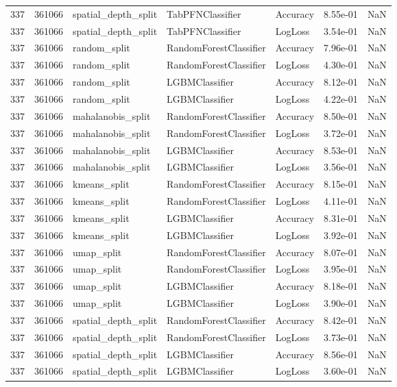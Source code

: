 \begin{tabular}{rrlllrr}
337 & 361066 & spatial\_depth\_split & TabPFNClassifier & Accuracy & 8.55e-01 & NaN \\
337 & 361066 & spatial\_depth\_split & TabPFNClassifier & LogLoss & 3.54e-01 & NaN \\
337 & 361066 & random\_split & RandomForestClassifier & Accuracy & 7.96e-01 & NaN \\
337 & 361066 & random\_split & RandomForestClassifier & LogLoss & 4.30e-01 & NaN \\
337 & 361066 & random\_split & LGBMClassifier & Accuracy & 8.12e-01 & NaN \\
337 & 361066 & random\_split & LGBMClassifier & LogLoss & 4.22e-01 & NaN \\
337 & 361066 & mahalanobis\_split & RandomForestClassifier & Accuracy & 8.50e-01 & NaN \\
337 & 361066 & mahalanobis\_split & RandomForestClassifier & LogLoss & 3.72e-01 & NaN \\
337 & 361066 & mahalanobis\_split & LGBMClassifier & Accuracy & 8.53e-01 & NaN \\
337 & 361066 & mahalanobis\_split & LGBMClassifier & LogLoss & 3.56e-01 & NaN \\
337 & 361066 & kmeans\_split & RandomForestClassifier & Accuracy & 8.15e-01 & NaN \\
337 & 361066 & kmeans\_split & RandomForestClassifier & LogLoss & 4.11e-01 & NaN \\
337 & 361066 & kmeans\_split & LGBMClassifier & Accuracy & 8.31e-01 & NaN \\
337 & 361066 & kmeans\_split & LGBMClassifier & LogLoss & 3.92e-01 & NaN \\
337 & 361066 & umap\_split & RandomForestClassifier & Accuracy & 8.07e-01 & NaN \\
337 & 361066 & umap\_split & RandomForestClassifier & LogLoss & 3.95e-01 & NaN \\
337 & 361066 & umap\_split & LGBMClassifier & Accuracy & 8.18e-01 & NaN \\
337 & 361066 & umap\_split & LGBMClassifier & LogLoss & 3.90e-01 & NaN \\
337 & 361066 & spatial\_depth\_split & RandomForestClassifier & Accuracy & 8.42e-01 & NaN \\
337 & 361066 & spatial\_depth\_split & RandomForestClassifier & LogLoss & 3.73e-01 & NaN \\
337 & 361066 & spatial\_depth\_split & LGBMClassifier & Accuracy & 8.56e-01 & NaN \\
337 & 361066 & spatial\_depth\_split & LGBMClassifier & LogLoss & 3.60e-01 & NaN \\

\end{tabular}
